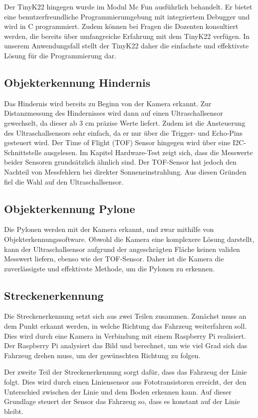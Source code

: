 \documentclass[../main.tex]{subfiles}
\begin{document}
Der TinyK22 hingegen wurde im Modul Mc Fun ausführlich behandelt. Er bietet eine benutzerfreundliche Programmierumgebung mit integriertem Debugger und wird in C programmiert. Zudem können bei Fragen die Dozenten konsultiert werden, die bereits über umfangreiche Erfahrung mit dem TinyK22 verfügen. In unserem Anwendungsfall stellt der TinyK22 daher die einfachste und effektivste Lösung für die Programmierung dar.


\subsection{Objekterkennung Hindernis}
Das Hindernis wird bereits zu Beginn von der Kamera erkannt. Zur Distanzmessung des Hindernisses wird dann auf einen Ultraschallsensor gewechselt, da dieser ab 3 cm präzise Werte liefert. Zudem ist die Ansteuerung des Ultraschallsensors sehr einfach, da er nur über die Trigger- und Echo-Pins gesteuert wird. Der Time of Flight (TOF) Sensor hingegen wird über eine I2C-Schnittstelle ausgelesen. Im Kapitel Hardware-Test zeigt sich, dass die Messwerte beider Sensoren grundsätzlich ähnlich sind. Der TOF-Sensor hat jedoch den Nachteil von Messfehlern bei direkter Sonneneinstrahlung. Aus diesen Gründen fiel die Wahl auf den Ultraschallsensor.


\subsection{Objekterkennung Pylone}
Die Pylonen werden mit der Kamera erkannt, und zwar mithilfe von Objekterkennungssoftware. Obwohl die Kamera eine komplexere Lösung darstellt, kann der Ultraschallsensor aufgrund der angeschrägten Fläche keinen validen Messwert liefern, ebenso wie der TOF-Sensor. Daher ist die Kamera die zuverlässigste und effektivste Methode, um die Pylonen zu erkennen.


\subsection{Streckenerkennung}
Die Streckenerkennung setzt sich aus zwei Teilen zusammen. Zunächst muss an dem Punkt erkannt werden, in welche Richtung das Fahrzeug weiterfahren soll. Dies wird durch eine Kamera in Verbindung mit einem Raspberry Pi realisiert. Der Raspberry Pi analysiert das Bild und berechnet, um wie viel Grad sich das Fahrzeug drehen muss, um der gewünschten Richtung zu folgen.

Der zweite Teil der Streckenerkennung sorgt dafür, dass das Fahrzeug der Linie folgt. Dies wird durch einen Liniensensor aus Fototransistoren erreicht, der den Unterschied zwischen der Linie und dem Boden erkennen kann. Auf dieser Grundlage steuert der Sensor das Fahrzeug so, dass es konstant auf der Linie bleibt.
\end{document}
